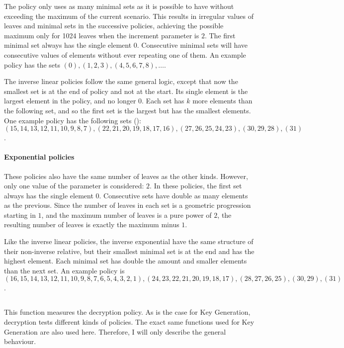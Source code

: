 \documentclass{article}
\begin{document}
The policy only uses as many minimal sets as it is possible to have without exceeding the maximum of the current scenario. This results in irregular values of leaves and minimal sets in the successive policies, achieving the possible maximum only for 1024 leaves when the increment parameter is $2$. The first minimal set always has the single element $0$. Consecutive minimal sets will have consecutive values of elements without ever repeating one of them. An example policy has the sets $(0), (1,2,3), (4,5,6,7,8), \ldots$.

The inverse linear policies follow the same general logic, except that now the smallest set is at the end of policy and not at the start. Its single element is the largest element in the policy, and no longer $0$. Each set has $k$ more elements than the following set, and so the first set is the largest but has the smallest elements. One example policy has the following sets (): 
$(15,14,13,12,11,10,9,8,7),(22,21,20,19,18,17,16),(27,26,25,24,23),(30,29,28),(31)$.

\paragraph{Exponential policies}
These policies also have the same number of leaves as the other kinds. However, only one value of the parameter  is considered: $2$. In these policies, the first set always has the single element $0$. Consecutive sets have double as many elements as the previous. Since the number of leaves in each set is a geometric progression starting in $1$, and the maximum number of leaves is a pure power of $2$, the resulting number of leaves is exactly the maximum minus $1$.

Like the inverse linear policies, the inverse exponential have the same structure of their non-inverse relative, but their smallest minimal set is at the end and has the highest element. Each minimal set has double the amount and smaller elements than the next set. An example policy is 
$(16,15,14,13,12,11,10,9,8,7,6,5,4,3,2,1),(24,23,22,21,20,19,18,17),(28,27,26,25),(30,29),(31)$.

\subsection{}
This function measures the decryption policy. As is the case for Key Generation, decryption tests different kinds of policies. The exact same functions used for Key Generation are also used here. Therefore, I will only describe the general behaviour.
\end{document}
